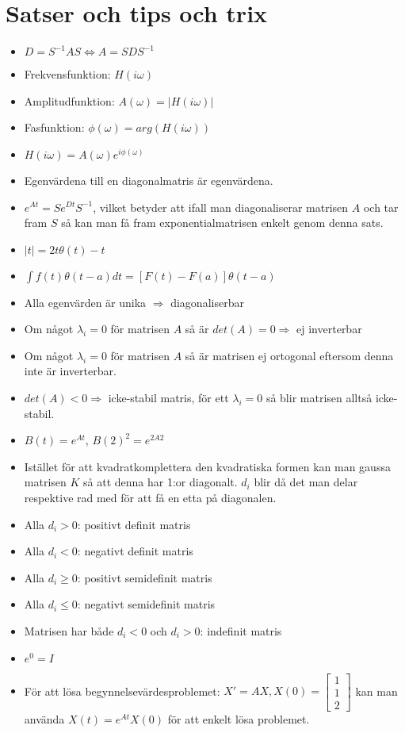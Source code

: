 \documentclass[a4paper]{article}
\begin{document}
\section{Satser och tips och trix}
\begin{itemize}
\item $D=S^{-1}AS \Leftrightarrow A=SDS^{-1}$
\item Frekvensfunktion: $H(i\omega)$
\item Amplitudfunktion: $A(\omega)=|H(i\omega)|$
\item Fasfunktion:      $\phi(\omega)=arg(H(i\omega))$
\item $H(i\omega)=A(\omega)e^{i\phi(\omega)}$
\item Egenvärdena till en diagonalmatris är egenvärdena.
\item $e^{At}=Se^{Dt}S^{-1}$, vilket betyder att ifall man diagonaliserar matrisen $A$ och tar fram $S$ så kan man få fram exponentialmatrisen enkelt genom denna sats.
\item $|t|=2t\theta(t)-t$
\item ${\int}f(t)\theta(t-a)dt=[F(t)-F(a)]\theta(t-a)$
\item Alla egenvärden är unika $\Rightarrow$ diagonaliserbar
\item Om något $\lambda_i=0$ för matrisen $A$ så är $det(A)=0\Rightarrow$ ej inverterbar 
\item Om något $\lambda_i=0$ för matrisen $A$ så är matrisen ej ortogonal eftersom denna inte är inverterbar.
\item $det(A)<0\Rightarrow$ icke-stabil matris, för ett $\lambda_i=0$ så blir matrisen alltså icke-stabil.
\item $B(t)=e^{At}$, $B(2)^2=e^{2A2}$
\item Istället för att kvadratkomplettera den kvadratiska formen kan man gaussa matrisen $K$ så att denna har 1:or diagonalt. $d_i$ blir då det man delar respektive rad med för att få en etta på diagonalen.
\item Alla $d_i>0$: positivt definit matris
\item Alla $d_i<0$: negativt definit matris
\item Alla $d_i\geq0$: positivt semidefinit matris
\item Alla $d_i\leq0$: negativt semidefinit matris
\item Matrisen har både $d_i<0$ och $d_i>0$: indefinit matris
\item $e^0 = I$
\item För att lösa begynnelsevärdesproblemet: $X'=AX, X(0)=\begin{bmatrix} 1 \\ 1 \\ 2 \end{bmatrix}$ kan man använda $X(t)=e^{At}X(0)$ för att enkelt lösa problemet.

\end{itemize}
\end{document}
